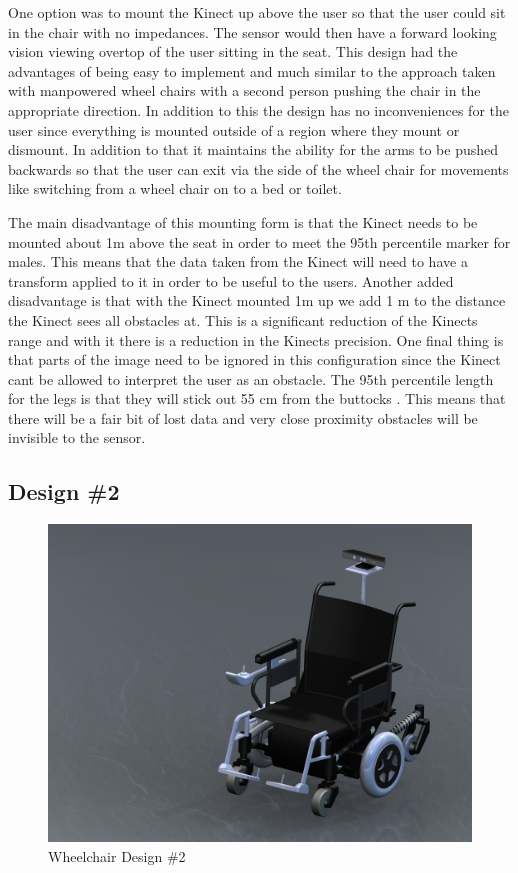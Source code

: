 \documentclass[oneside,final,a4paper]{report}
\begin{document}
One option was to mount the Kinect up above the user so that the user could sit in the chair with no impedances. The sensor would then have a forward looking vision viewing overtop of the user sitting in the seat. This design had the advantages of being easy to implement and much similar to the approach taken with manpowered wheel chairs with a second person pushing the chair in the appropriate direction. In addition to this the design has no inconveniences for the user since everything is mounted outside of a region where they mount or dismount. In addition to that it maintains the ability for the arms to be pushed backwards so that the user can exit via the side of the wheel chair for movements like switching from a wheel chair on to a bed or toilet.

The main disadvantage of this mounting form is that the Kinect needs to be mounted about 1m above the seat in order to meet the 95th percentile marker for males. This means that the data taken from the Kinect will need to have a transform applied to it in order to be useful to the users. Another added disadvantage is that with the Kinect mounted 1m up we add 1 m to the distance the Kinect sees all obstacles at. This is a significant reduction of the Kinects range and with it there is a reduction in the Kinects precision. One final thing is that parts of the image need to be ignored in this configuration since the Kinect cant be allowed to interpret the user as an obstacle. The 95th percentile length for the legs is that they will stick out 55 cm from the buttocks \cite{NASA}. This means that there will be a fair bit of lost data and very close proximity obstacles will be invisible to the sensor.

\subsection{Design \#2}
\begin{figure}[hbt]
 \centering
 \includegraphics[scale=0.15]{WheelChair_2}
 \caption{Wheelchair Design \#2}
\end{figure}
\end{document}
